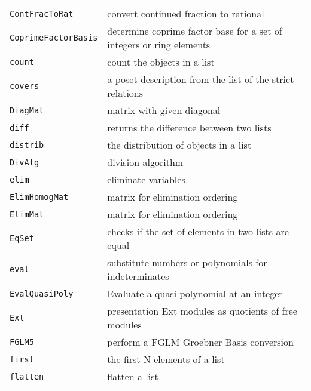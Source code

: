 \documentclass[a4paper]{mybook}
\begin{document}
\begin{center}
\begin{longtable}{ll}
{\verb~ContFracToRat~} &
      convert continued fraction to rational\\
   
{\verb~CoprimeFactorBasis~} &
      determine coprime factor base for a set of integers or ring elements\\
   
{\verb~count~} &
      count the objects in a list\\
   
{\verb~covers~} &
      a poset description from the list of the strict relations\\
   
{\verb~DiagMat~} &
      matrix with given diagonal\\
   
{\verb~diff~} &
      returns the difference between two lists\\
   
{\verb~distrib~} &
      the distribution of objects in a list\\
   
{\verb~DivAlg~} &
      division algorithm\\
   
{\verb~elim~} &
      eliminate variables\\
   
{\verb~ElimHomogMat~} &
      matrix for elimination ordering\\
   
{\verb~ElimMat~} &
      matrix for elimination ordering\\
   
{\verb~EqSet~} &
      checks if the set of elements in two lists are equal\\
   
{\verb~eval~} &
      substitute numbers or polynomials for indeterminates\\
   
{\verb~EvalQuasiPoly~} &
      Evaluate a quasi-polynomial at an integer\\
   
{\verb~Ext~} &
      presentation Ext modules as quotients of free modules\\
   
{\verb~FGLM5~} &
      perform a FGLM Groebner Basis conversion\\
   
{\verb~first~} &
      the first N elements of a list\\
   
{\verb~flatten~} &
      flatten a list\\
   

\end{longtable}
\end{center}
\end{document}
